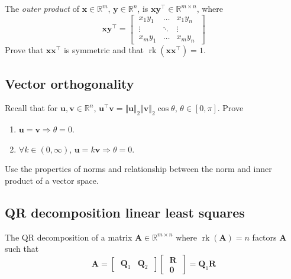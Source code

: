 \documentclass{article}
\numberwithin{equation}{section}
\begin{document}
The \textit{outer product} of $ \mathbf{x} \in \mathbb{R}^m $,
$ \mathbf{y} \in \mathbb{R}^n $, is $ \mathbf{xy}^\top \in
\mathbb{R}^{m \times n} $, where
\begin{equation*}
    \mathbf{xy}^\top = \begin{bmatrix}
        \ x_1y_1 & \ldots & x_1y_n \ \\
        \ \vdots & \ddots & \vdots \ \\
        \ x_my_1 & \ldots & x_my_n \
    \end{bmatrix}
\end{equation*}
Prove that $ \mathbf{xx}^\top $ is symmetric and that
$ \operatorname{rk}\left(\mathbf{xx}^\top\right) = 1 $.

\subsection{Vector orthogonality}

Recall that for $ \mathbf{u}, \mathbf{v} \in \mathbb{R}^n $,
$ \mathbf{u}^\top\mathbf{v} = \Vert\mathbf{u}\Vert_2\Vert\mathbf{v}\Vert_2
\cos\theta $, $ \theta \in [0, \pi] $. Prove
\begin{enumerate}[label = \alph*.]
    \item
    $ \mathbf{u} = \mathbf{v} \Rightarrow \theta = 0 $.

    \item
    $ \forall k \in (0, \infty) $, $ \mathbf{u} = k\mathbf{v} \Rightarrow
    \theta = 0 $.
\end{enumerate}
Use the properties of norms and relationship between the norm and inner
product of a vector space.

\subsection{QR decomposition linear least squares}

The QR decomposition of a matrix $ \mathbf{A} \in \mathbb{R}^{m \times n} $
where $ \operatorname{rk}(\mathbf{A}) = n $ factors $ \mathbf{A} $ such that
\cite{bv_convex_opt}
\begin{equation*}
    \mathbf{A} = \begin{bmatrix} \ \mathbf{Q}_1 & \mathbf{Q}_2 \ \end{bmatrix}
    \begin{bmatrix} \ \mathbf{R} \ \\ \ \mathbf{0} \ \end{bmatrix}
     = \mathbf{Q}_1\mathbf{R}
\end{equation*}
\end{document}
